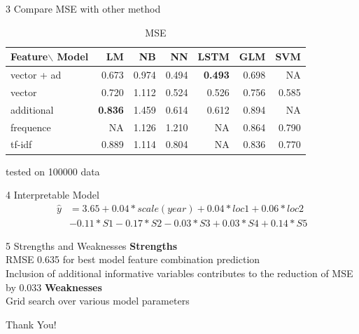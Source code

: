 \documentclass[10pt]{beamer}
\begin{document}
\begin{frame}{3 Compare MSE with other method}

\begin{table}[]
\centering
\caption*{\huge{MSE} }

\begin{tabular}{lrrrrrr}
Feature$\backslash$ Model &LM    & NB &NN  &LSTM  &GLM  & SVM \\
\hline
vector + ad   & 0.673     & 0.974  & 0.494   & \large\textbf{0.493}  & 0.698    & NA \\
vector        & 0.720     & 1.112  & 0.524   & 0.526  & 0.756    & 0.585  \\
additional            & \textbf{0.836}    & 1.459  & 0.614   & 0.612  & 0.894    & NA  \\
frequence     & NA & 1.126  & 1.210   & NA  & 0.864    & 0.790  \\
tf-idf        & 0.889 & 1.114 & 0.804   & NA  & 0.836    & 0.770  \\
\hline

\end{tabular}
\begin{tablenotes}
	\small
	\item tested on 100000 data
\end{tablenotes}

\end{table}

\end{frame}

\begin{frame}{4 Interpretable Model}
$$
\begin{aligned}
\hat{y} &=3.65+0.04* scale(year)+0.04*loc1+0.06*loc2\\
&-0.11*S1-0.17*S2-0.03*S3+0.03*S4+0.14*S5
\end{aligned}
$$


\end{frame}


\begin{frame}{5 Strengths and Weaknesses}
\textbf{Strengths} \\
RMSE 0.635 for best model feature combination prediction\\
 Inclusion of additional informative variables contributes to the reduction of MSE by 0.033
 \newline
 \newline
\textbf{Weaknesses}\\
Grid search over various model parameters 
\end{frame}

\begin{frame}
\Huge{\centerline{Thank You!}}
\end{frame}
\end{document}
